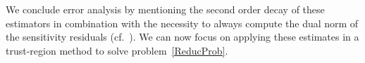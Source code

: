 We conclude error analysis by mentioning the second order decay of these estimators in combination with the necessity to always compute the dual norm of the sensitivity residuals (cf.~\cite{Keil2021}).
We can now focus on applying these estimates in a trust-region method to solve problem~\eqref{ReducProb}.